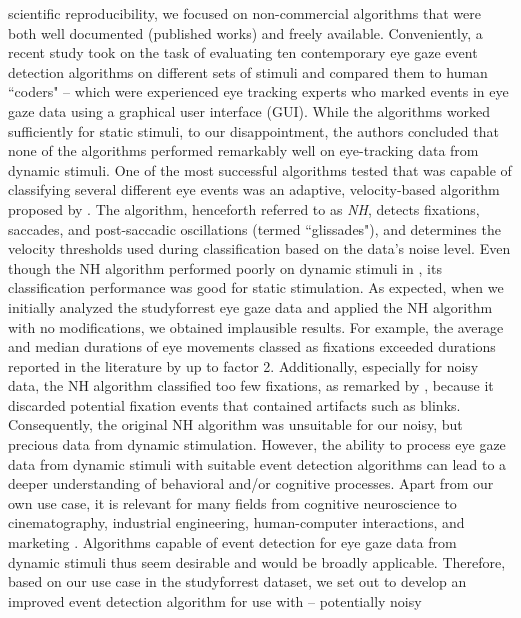     scientific reproducibility, we focused on non-commercial algorithms that were both well documented (published
    works) and freely available. Conveniently, a recent study \citep{Andersson2017} took on the task of evaluating
    ten contemporary eye gaze event detection algorithms on  different sets of stimuli and compared them to human
    ``coders" -- which were experienced eye tracking experts who marked events in eye gaze data using a graphical
    user interface (GUI). While the algorithms worked sufficiently for static stimuli, to our disappointment, the
    authors concluded that none of the algorithms performed remarkably well on eye-tracking data from dynamic stimuli.
    One of the most successful algorithms tested that was capable of classifying several different eye
    events was an adaptive, velocity-based algorithm proposed by \citet{Nystrom2010AnData}.
    The algorithm, henceforth referred to as \textit{NH}, detects fixations, saccades, and post-saccadic
    oscillations (termed ``glissades"), and determines the velocity thresholds used during classification based on the
    data's noise level. Even though the NH algorithm performed poorly on dynamic stimuli in \citet{Andersson2017}, its
    classification performance was good for static stimulation. As expected, when we initially analyzed the
    studyforrest eye gaze data and applied the NH algorithm with no modifications, we obtained implausible results.
    For example, the average and median durations of eye movements  classed as fixations exceeded durations  reported in
    the literature \citep{holmqvist2011eye,dorr2010variability} by up to factor 2. Additionally, especially for noisy
    data, the NH algorithm classified too few fixations, as remarked by \citet{Friedman2018}, because it discarded
    potential fixation events that contained artifacts such as blinks. Consequently, the original NH algorithm was
    unsuitable for our noisy, but precious data from dynamic stimulation.
    However, the ability to process eye gaze data from dynamic stimuli with suitable event detection algorithms can
    lead to a deeper understanding of behavioral and/or cognitive processes. Apart from our own use case, it is
    relevant for many fields from  cognitive neuroscience to cinematography, industrial engineering, human-computer
    interactions, and marketing \citep{Duchowski2002}. Algorithms capable of event detection for eye gaze data
    from dynamic stimuli thus seem desirable and would be broadly applicable. Therefore, based on our use case in the
    studyforrest dataset, we set out to develop an improved event detection algorithm for use with -- potentially noisy
